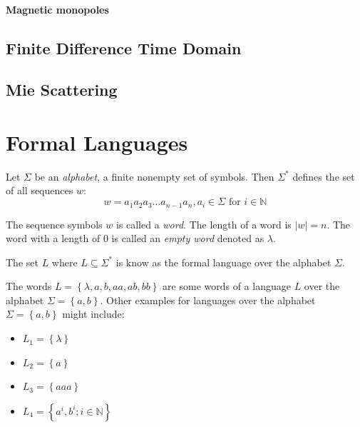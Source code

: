 \paragraph{Magnetic monopoles}

\subsection*{Finite Difference Time Domain}
\subsection*{Mie Scattering}
\section{Formal Languages}


\begin{definition}[Alphabet]
\label{def:alphabet}
Let $\Sigma$ be an \emph{alphabet}, a finite nonempty set of symbols. Then $\Sigma ^{*}$ defines the set of all sequences $w$:
$$w= a_1 a_2 a_3 \dots a_{n-1} a_n, a_i \in \Sigma \text{ for } i \in \mathbb{N}$$
\end{definition}

The sequence symbols $w$ is called a \emph{word}. The length of a word is $|w| = n$. The word with a length of 0 is called an \emph{empty word} denoted as $\lambda$.

\begin{definition}[Language]
\label{def:language}
The set $L$ where $L\subseteq \Sigma^{*}$ is know as the formal language over the alphabet $\Sigma$. 
\end{definition}
The words $L = \left\lbrace \lambda, a, b, aa, ab, bb \right\rbrace$ are some words of a language $L$ over the alphabet $\Sigma=\left\lbrace a,b \right\rbrace$.
Other examples for languages over the alphabet $\Sigma=\left\lbrace a,b \right\rbrace$ might include:
\begin{itemize}

\item $L_1 = \left\lbrace \lambda \right\rbrace$
\item $L_2 = \left\lbrace a \right\rbrace$
\item $L_3 = \left\lbrace aaa \right\rbrace$
\item $L_4 = \left\lbrace a^i,b^i; i \in \mathbb{N} \right\rbrace$
\end{itemize}



